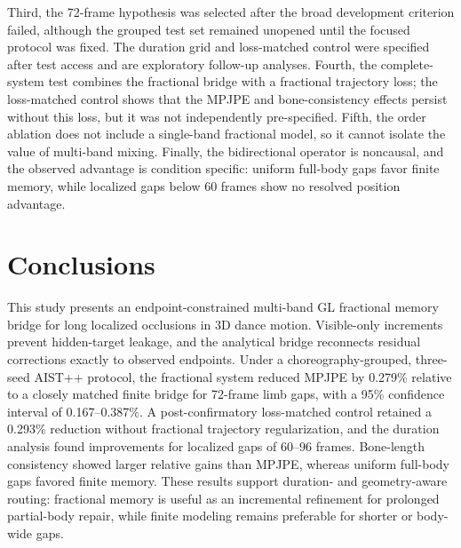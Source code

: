 \documentclass[fractalfract,article,submit,moreauthors,pdftex]{Definitions/mdpi}
\begin{document}
Third, the 72-frame hypothesis was selected after the broad development criterion failed, although the grouped test set remained unopened until the focused protocol was fixed. The duration grid and loss-matched control were specified after test access and are exploratory follow-up analyses. Fourth, the complete-system test combines the fractional bridge with a fractional trajectory loss; the loss-matched control shows that the MPJPE and bone-consistency effects persist without this loss, but it was not independently pre-specified. Fifth, the order ablation does not include a single-band fractional model, so it cannot isolate the value of multi-band mixing. Finally, the bidirectional operator is noncausal, and the observed advantage is condition specific: uniform full-body gaps favor finite memory, while localized gaps below 60 frames show no resolved position advantage.

\section{Conclusions}

This study presents an endpoint-constrained multi-band GL fractional memory bridge for long localized occlusions in 3D dance motion. Visible-only increments prevent hidden-target leakage, and the analytical bridge reconnects residual corrections exactly to observed endpoints. Under a choreography-grouped, three-seed AIST++ protocol, the fractional system reduced MPJPE by 0.279\% relative to a closely matched finite bridge for 72-frame limb gaps, with a 95\% confidence interval of 0.167--0.387\%. A post-confirmatory loss-matched control retained a 0.293\% reduction without fractional trajectory regularization, and the duration analysis found improvements for localized gaps of 60--96 frames. Bone-length consistency showed larger relative gains than MPJPE, whereas uniform full-body gaps favored finite memory. These results support duration- and geometry-aware routing: fractional memory is useful as an incremental refinement for prolonged partial-body repair, while finite modeling remains preferable for shorter or body-wide gaps.

\end{document}
